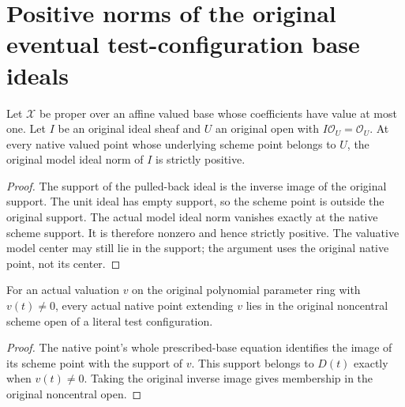 \section{Positive norms of the original eventual test-configuration base ideals}

\begin{lemma}\label{lem:model-ideal-positive-on-unit-restriction}
\leanok
{}
Let $\mathcal X$ be proper over an affine valued base whose coefficients
have value at most one. Let $I$ be an original ideal sheaf and $U$ an
original open with $I\mathcal O_U=\mathcal O_U$. At every native valued
point whose underlying scheme point belongs to $U$, the original model
ideal norm of $I$ is strictly positive.
\end{lemma}
\begin{proof}
The support of the pulled-back ideal is the inverse image of the original
support. The unit ideal has empty support, so the scheme point is outside
the original support. The actual model ideal norm vanishes exactly at the
native scheme support. It is therefore nonzero and hence strictly positive.
The valuative model center may still lie in the support; the argument uses
the original native point, not its center.
\end{proof}

\begin{lemma}\label{lem:native-test-configuration-valued-point-unit-open}
\leanok
{}
For an actual valuation $v$ on the original polynomial parameter ring
with $v(t)\ne0$, every actual native point extending $v$ lies in the
original noncentral scheme open of a literal test configuration.
\end{lemma}
\begin{proof}
The native point's whole prescribed-base equation identifies the image of
its scheme point with the support of $v$. This support belongs to $D(t)$
exactly when $v(t)\ne0$. Taking the original inverse image gives membership
in the original noncentral open.
\end{proof}

